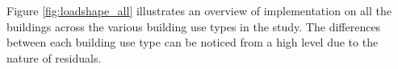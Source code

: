 Figure \ref{fig:loadshape_all} illustrates an overview of implementation on all the buildings across the various building use types in the study. The differences between each building use type can be noticed from a high level due to the nature of residuals.